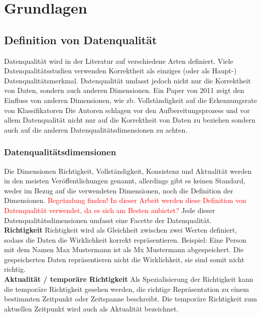\chapter{Grundlagen}\label{ch:data}

\section{Definition von Datenqualität}
Datenqualität wird in der Literatur auf verschiedene Arten definiert. 
Viele Datenqualitätsstudien verwenden Korrektheit als einziges (oder als Haupt-) Datenqualitätsmerkmal. \cite{wang1996}
Datenqualität umfasst jedoch nicht nur die Korrektheit von Daten, sondern auch anderen Dimensionen. 
Ein Paper von 2011 zeigt den Einfluss von anderen Dimensionen, wie zb. Vollständigkeit auf die Erkennungsrate von Klassifikatoren \cite{espinosaoliva2011} Die Autoren schlagen vor den Aufbereitungsprozess und vor allem Datenqualität nicht nur auf die Korrektheit von Daten zu beziehen sondern auch auf die anderen Datenqualitätsdimensionen zu achten.

\subsection{Datenqualitätsdimensionen}
Die Dimensionen Richtigkeit, Vollständigkeit, Konsistenz und Aktualität werden in den meisten Veröffentlichungen genannt, allerdings gibt es keinen Standard, weder im Bezug auf die verwendeten Dimensionen, noch die Definition der Dimensionen. \cite{scannapieco2002}
\textcolor{red}{Begründung finden! In dieser Arbeit werden diese Definition von Datenqualität verwendet, da es sich am Besten anbietet?}
Jede dieser Datenqualitätsdimensionen umfasst eine Facette der Datenqualität.
\\ \textbf{Richtigkeit}
Richtigkeit wird als Gleichheit zwischen zwei Werten definiert, sodass die Daten die Wirklichkeit korrekt repräsentieren. 
Beispiel: Eine Person mit dem Namen Max Mustermann ist als Mx Mustermann abgespeichert. 
Die gespeicherten Daten repräsentieren nicht die Wirklichkeit, sie sind somit nicht richtig.
\\ \textbf{Aktualität / temporäre Richtigkeit}
Als Spezialisierung der Richtigkeit kann die temporäre Richtigkeit gesehen werden, die richtige Repräsentation zu einem bestimmten Zeitpunkt oder Zeitspanne beschreibt. 
Die temporäre Richtigkeit zum aktuellen Zeitpunkt wird auch als Aktualität bezeichnet. \\


